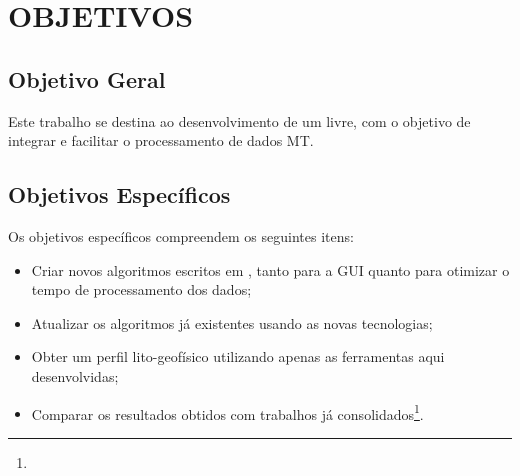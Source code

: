 \chapter{OBJETIVOS}

	\section{Objetivo Geral}
        Este trabalho se destina ao desenvolvimento de um  livre, com o objetivo de integrar e facilitar o processamento de dados MT.
    
    \section{Objetivos Específicos}
        
        Os objetivos específicos compreendem os seguintes itens:
        
        \begin{itemize}
            \item Criar novos algoritmos escritos em \Python, tanto para a GUI quanto para otimizar o tempo de processamento dos dados;
            \item Atualizar os algoritmos já existentes usando as novas tecnologias;
            \item Obter um perfil lito-geofísico utilizando apenas as ferramentas aqui desenvolvidas;
            \item Comparar os resultados obtidos com trabalhos já consolidados\footnote{}.
        \end{itemize}
